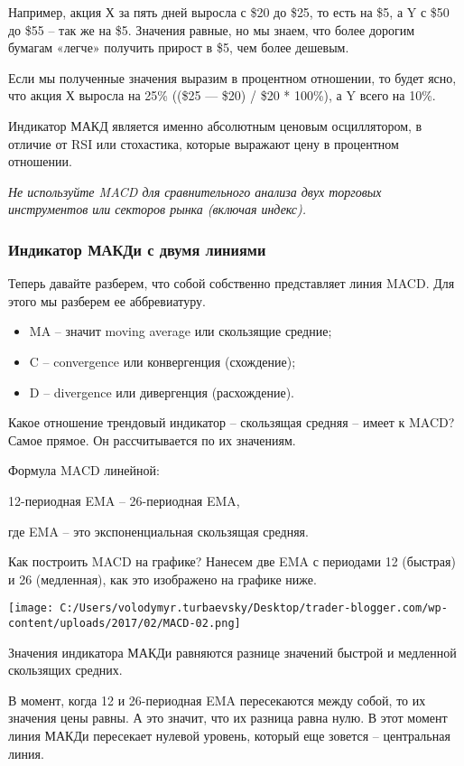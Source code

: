 \documentclass[a5paper]{article}
\begin{document}
Например, акция Х за пять дней выросла с \$20 до \$25, то есть на \$5, а Y с \$50 до \$55 – так же на \$5. Значения равные, но мы знаем, что более дорогим бумагам «легче» получить прирост в \$5, чем более дешевым.

Если мы полученные значения выразим в процентном отношении, то будет ясно, что акция Х выросла на 25\% ((\$25 — \$20) / \$20 * 100\%), а Y всего на 10\%.

Индикатор МАКД является именно абсолютным ценовым осциллятором, в отличие от RSI или стохастика, которые выражают цену в процентном отношении.

\emph{Не используйте MACD для сравнительного анализа двух торговых
  инструментов или секторов рынка (включая индекс).}

\subsubsection{Индикатор МАКДи с двумя линиями}

Теперь давайте разберем, что собой собственно представляет линия MACD. Для этого мы разберем ее аббревиатуру.
\begin{itemize}
\item     MA – значит moving average или скользящие средние;
\item     C – convergence или конвергенция (схождение);
\item     D – divergence или дивергенция (расхождение).
\end{itemize}

Какое отношение трендовый индикатор – скользящая средняя – имеет к MACD? Самое прямое. Он рассчитывается по их значениям.

Формула MACD линейной:

    12-периодная EMA – 26-периодная EMA,

где EMA – это экспоненциальная скользящая средняя.

Как построить MACD на графике? Нанесем две EMA с периодами 12
(быстрая) и 26 (медленная), как это изображено на графике ниже.

\texttt{[image: C:/Users/volodymyr.turbaevsky/Desktop/trader-blogger.com/wp-content/uploads/2017/02/MACD-02.png]}

Значения индикатора МАКДи равняются разнице значений быстрой и медленной скользящих средних.

В момент, когда 12 и 26-периодная EMA пересекаются между собой, то их
значения цены равны. А это значит, что их разница равна нулю. В этот
момент линия МАКДи пересекает нулевой уровень, который еще зовется –
центральная линия.
\end{document}
